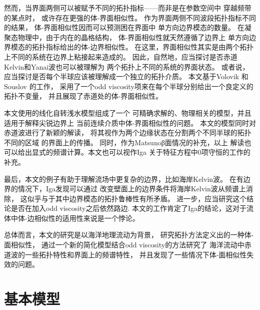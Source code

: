 \documentclass[UTF8,zihao=5]{ctexart} %
\begin{document}
然而，当界面两侧可以被赋予不同的拓扑指标——而非是在参数空间中
穿越频带的某点时，
或许存在更强的体-界面相似性。
作为界面两侧不同波段拓扑指标不同的结果，
体-界面相似性因而可以预测困在界面中
单方向边界模态的数量。
在凝聚态物理中，由于内在的晶格结构，
体-界面相似性就天然遵循了边界上
单方向边界模态的拓扑指标给出的体-边界相似性\cite{hatsugai1993chern,graf2013bulk}。
在这里，界面相似性其实是由两个拓扑上不同的系统在边界上粘接起来造成的。
因此，自然地，应当探讨是否赤道Kelvin和Yanai波也可以被理解为
两个拓扑上不同的系统的界面状态。
或者说，应当探讨是否每个半球应该被理解成一个独立的拓扑介质。
本文基于Volovik\cite{volovik1988analogue}
和Souslov\cite{souslov2019topological}
的工作，
采用了一个odd viscosity项来在每个半球分别给出一个良定义的拓扑不变量，
并且展现了赤道处的体-界面相似性。

本文使用的线化自转浅水模型组成了一个
可精确求解的、物理相关的模型，并且适用于解释尖锐边界上
当前连续介质中体-界面相似性的问题\cite{bal2019continuous,faure2019manifestation}。
本文的模型同时对赤道波进行了新颖的解读，
将其视作为两个边缘状态在分割两个不同半球的拓扑不同的区域
的界面上的传播。
同时，作为Matsuno\cite{matsuno1966quasi}β面情况的补充，以上
解读也可以给出显式的频谱计算。本文也可以视作Iga\cite{iga1995transition}
关于特征方程中0项守恒的工作的补充。

最后，本文的例子有助于理解流场中更复杂的边界，比如海岸Kelvin波。
在有边界的情况下，Iga\cite{iga1995transition}发现可以通过
改变壁面上的边界条件将海岸Kelvin波从频谱上消除，
这似乎与于其中边界模态的拓扑鲁棒性有所矛盾。
进一步，应当研究这个结论是否在加入odd viscosity之后依然路边\cite{souslov2019topological}.
本文的工作肯定了Iga的结论，这对于流体中体-边相似性的适用性来说是一个悖论。

总体而言，本文的研究是以海洋地理流动为背景，
研究拓扑方法定义出的一种体-面相似性，
通过一个新的简化模型结合odd viscosity的方法研究了
海洋流动中赤道波的一些拓扑特性和界面上的频谱特性，
并且发现了一些情况下体-面相似性失效的问题。

\section{基本模型}


\newcommand{\ee}{{\mathrm e}}
\newcommand{\ii}{{\mathrm i}}
\newcommand{\dd}{{\mathrm d}}
\end{document}
